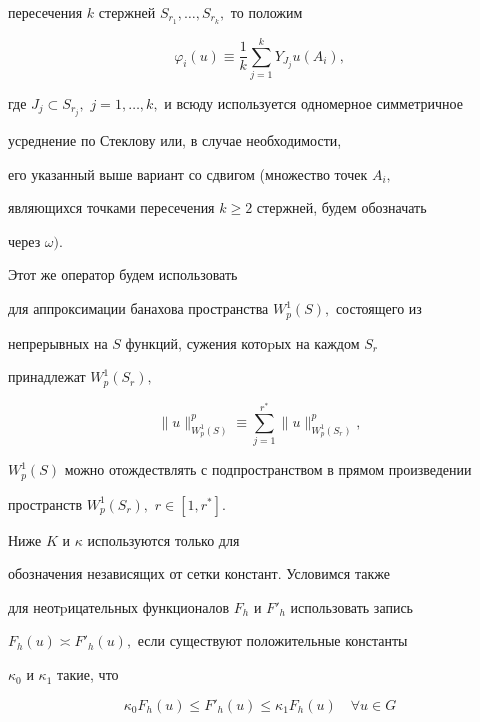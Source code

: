 пересечения $k$ стержней $S_{r_1},\dotsc,S_{r_k},$ то положим


\begin{equation}


\varphi_i(u)\equiv


\frac{1}{k}\sum_{j=1}^{k}Y_{J_j}u(A_i),


\end{equation}


где $J_j\subset


S_{r_j},$ $j=1,\dotsc,k,$ и всюду используется одномерное симметричное


усреднение по Стеклову или, в случае необходимо\-сти,


его указанный выше вариант со сдвигом (множество точек $A_i,$


являющихся точками пересечения $k\ge 2$ стержней, будем обозна\-чать


через $\omega).$





Этот же оператор будем использовать


для аппроксимации банахова пространства $W_p^1(S),$ состоящего из


непрерывных на $S$ функций, сужения котоpых на каждом $S_r$


принадлежат $W_p^1(S_r),$


$$


\|u\|^p_{W_p^1(S)}\equiv


\sum_{j=1}^{r^*}\|u\|^p_{W_p^1(S_r)},


$$


$W_p^1(S)$ можно отождествлять с подпространством в прямом произ\-ведении


пространств $W_p^1(S_r),$ $r\in [1,r^{*}].$





Ниже $K$ и $\kappa$ используются только для


обозначения независящих от сетки констант. Условимся также


для неотpицательных функ\-ционалов $F_h$ и $F'_h$ использовать запись


$F_h(u)\asymp F'_h(u), $ если сущест\-вуют положительные константы


$\kappa_0$ и $\kappa_1$ такие, что


$$


\kappa_0 F_h(u)\le F'_h(u)\le \kappa_1 F_h(u)\quad \forall u\in G


$$


